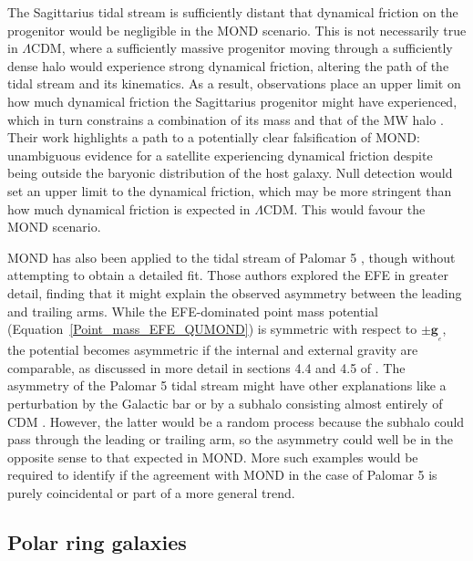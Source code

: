 \documentclass[fleqn,usenatbib,useAMS,onecolumn]{mnras} %
\begin{document}
The Sagittarius tidal stream is sufficiently distant that dynamical friction on the progenitor would be negligible in the MOND scenario. This is not necessarily true in $\Lambda$CDM, where a sufficiently massive progenitor moving through a sufficiently dense halo would experience strong dynamical friction, altering the path of the tidal stream and its kinematics. As a result, observations place an upper limit on how much dynamical friction the Sagittarius progenitor might have experienced, which in turn constrains a combination of its mass and that of the MW halo \citep{Dierickx_2017}. Their work highlights a path to a potentially clear falsification of MOND: unambiguous evidence for a satellite experiencing dynamical friction despite being outside the baryonic distribution of the host galaxy. Null detection would set an upper limit to the dynamical friction, which may be more stringent than how much dynamical friction is expected in $\Lambda$CDM. This would favour the MOND scenario.

MOND has also been applied to the tidal stream of Palomar 5 \citep{Thomas_2018}, though without attempting to obtain a detailed fit. Those authors explored the EFE in greater detail, finding that it might explain the observed asymmetry between the leading and trailing arms. While the EFE-dominated point mass potential (Equation~\ref{Point_mass_EFE_QUMOND}) is symmetric with respect to $\pm \bm{g}_{_e}$, the potential becomes asymmetric if the internal and external gravity are comparable, as discussed in more detail in sections 4.4 and 4.5 of \citet{Banik_2020_M33}. The asymmetry of the Palomar 5 tidal stream might have other explanations like a perturbation by the Galactic bar \citep{Bonaca_2020} or by a subhalo consisting almost entirely of CDM \citep{Bovy_2019}. However, the latter would be a random process because the subhalo could pass through the leading or trailing arm, so the asymmetry could well be in the opposite sense to that expected in MOND. More such examples would be required to identify if the agreement with MOND in the case of Palomar 5 is purely coincidental or part of a more general trend.



\subsection{Polar ring galaxies}
\label{Polar_ring_galaxies}
\end{document}
